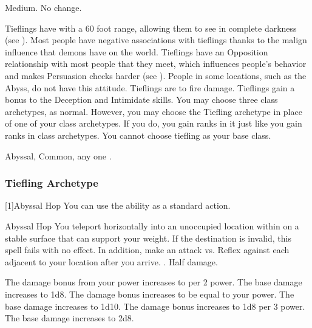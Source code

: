          Medium.
         No change.
        \begin{itemize}
             Tieflings have  with a 60 foot range, allowing them to see in complete darkness (see ).
             Most people have negative associations with tieflings thanks to the malign influence that demons have on the world.
                Tieflings have an Opposition relationship with most people that they meet, which influences people's behavior and makes Persuasion checks harder (see ).
                People in some locations, such as the Abyss, do not have this attitude.
             Tieflings are  to fire damage.
             Tieflings gain a  bonus to the Deception and Intimidate skills.
             You may choose three class archetypes, as normal.
                However, you may choose the Tiefling archetype in place of one of your class archetypes.
                If you do, you gain ranks in it just like you gain ranks in class archetypes.
                You cannot choose tiefling as your base class.
        \end{itemize}
         Abyssal, Common, any one .

        \subsubsection{Tiefling Archetype}
            [1]{Abyssal Hop} You can use the  ability as a standard action.
            \begin{magicalactiveability}{Abyssal Hop}
                \rankline
                You teleport horizontally into an unoccupied location within \shortrange on a stable surface that can support your weight.
                If the destination is invalid, this spell fails with no effect.
                In addition, make an attack vs. Reflex against each  adjacent to your location after you arrive.
                \hit {}.
                \miss Half damage.

                \rankline
                 The damage bonus from your power increases to  per 2 power.
                 The base damage increases to 1d8.
                 The damage bonus increases to be equal to your power.
                 The base damage increases to 1d10.
                 The damage bonus increases to 1d8 per 3 power.
                 The base damage increases to 2d8.
            \end{magicalactiveability}


